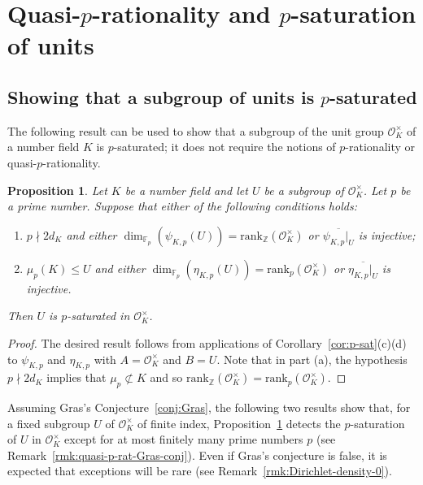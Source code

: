 \documentclass[12pt, a4paper, usenames]{amsart}
\newcommand{\Z}{\mathbb{Z}}
\newcommand{\F}{\mathbb{F}}
\theoremstyle{plain}
\newtheorem{prop}[theorem]{Proposition}
\theoremstyle{remark}
\theoremstyle{definition}
\newcommand{\rank}{\mathrm{rank}}
\begin{document}
\section{Quasi-$p$-rationality and $p$-saturation of units}\label{sec:p-rat-p-sat}

\subsection{Showing that a subgroup of units is $p$-saturated}\label{subsec:showing-units-p-saturated}
The following result can be used to show that a subgroup of the unit group
$\mathcal{O}_{K}^{\times}$ of a number field
$K$ is $p$-saturated; it does not require the notions of $p$-rationality or quasi-$p$-rationality.

\begin{prop}\label{prop:psi-eta-give-p-sat}
Let $K$ be a number field and let $U$ be a subgroup of $\mathcal{O}_{K}^{\times}$.
Let $p$ be a prime number. Suppose that either of the following conditions holds:
\begin{enumerate}
    \item $p \nmid 2d_{K}$ and either $\dim_{\F_p}(\psi_{K,p}(U))=\rank_{\Z}(\mathcal{O}_{K}^{\times})$
    or $\overline{\psi_{K,p} \vert_{U}}$ is injective;
    \item $\mu_{p}(K) \leq U$ and either $\dim_{\F_p}(\eta_{K,p}(U))=\rank_{p}(\mathcal{O}_{K}^{\times})$ or $\overline{\eta_{K,p} \vert_{U}}$ is injective.
\end{enumerate}
Then $U$ is $p$-saturated in $\mathcal{O}_{K}^{\times}$.
\end{prop}

\begin{proof}
The desired result follows from applications of 
Corollary~\ref{cor:p-sat}(c)(d) to $\psi_{K,p}$ and $\eta_{K,p}$
with $A=\mathcal{O}_{K}^{\times}$ and $B=U$.
Note that in part (a), the hypothesis $p \nmid 2d_{K}$ implies that $\mu_{p} \not\subset K$
and so $\rank_{\Z}(\mathcal{O}_{K}^{\times})=\rank_{p}(\mathcal{O}_{K}^{\times})$.
\end{proof}

Assuming Gras's Conjecture~\ref{conj:Gras}, the following two results
show that, for a fixed subgroup $U$ of $\mathcal{O}_{K}^{\times}$ of finite index,
Proposition~\ref{prop:psi-eta-give-p-sat} detects the $p$-saturation of 
$U$ in $\mathcal{O}_{K}^{\times}$ except for at most 
finitely many prime numbers $p$ (see Remark~\ref{rmk:quasi-p-rat-Gras-conj}).
Even if Gras's conjecture is false, it is expected that exceptions will be rare
(see Remark~\ref{rmk:Dirichlet-density-0}).
\end{document}

